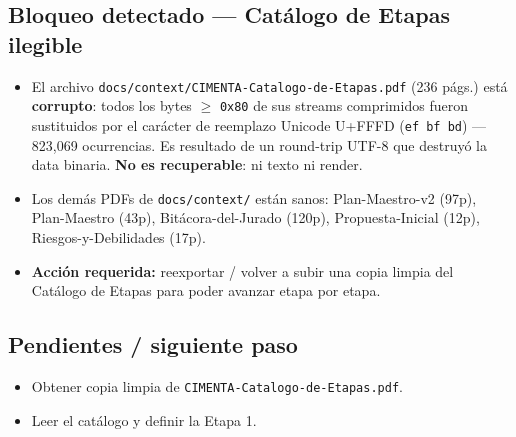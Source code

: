 \documentclass[11pt]{article}
\newcommand{\codigo}[1]{\texttt{#1}}
\newcommand{\pend}{\item[\textcolor{acento}{$\square$}]}
\begin{document}
\subsection*{Bloqueo detectado — Catálogo de Etapas ilegible}
\begin{itemize}
  \item El archivo \codigo{docs/context/CIMENTA-Catalogo-de-Etapas.pdf}
        (236 págs.) está \textbf{corrupto}: todos los bytes $\geq$ \codigo{0x80}
        de sus streams comprimidos fueron sustituidos por el carácter de
        reemplazo Unicode U+FFFD (\codigo{ef bf bd}) — 823{,}069 ocurrencias.
        Es resultado de un round-trip UTF-8 que destruyó la data binaria.
        \textbf{No es recuperable}: ni texto ni render.
  \item Los demás PDFs de \codigo{docs/context/} están sanos: Plan-Maestro-v2
        (97p), Plan-Maestro (43p), Bitácora-del-Jurado (120p), Propuesta-Inicial
        (12p), Riesgos-y-Debilidades (17p).
  \item \textbf{Acción requerida:} reexportar / volver a subir una copia limpia
        del Catálogo de Etapas para poder avanzar etapa por etapa.
\end{itemize}

\subsection*{Pendientes / siguiente paso}
\begin{itemize}
  \pend Obtener copia limpia de \codigo{CIMENTA-Catalogo-de-Etapas.pdf}.
  \pend Leer el catálogo y definir la Etapa 1.
\end{itemize}
\end{document}
